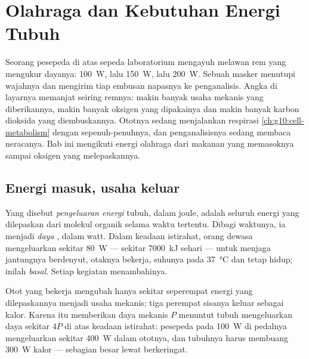 \chapter{Olahraga dan Kebutuhan Energi Tubuh}\label{ch:g10:exercise-and-energy}

Seorang pesepeda di atas sepeda laboratorium mengayuh melawan rem yang
mengukur dayanya: \qty{100}{W}, lalu \qty{150}{W}, lalu \qty{200}{W}.
Sebuah masker menutupi wajahnya dan mengirim tiap embusan napasnya ke
penganalisis. Angka di layarnya memanjat seiring remnya: makin banyak
usaha mekanis yang diberikannya, makin banyak oksigen yang dipakainya
dan makin banyak karbon dioksida yang diembuskannya. Ototnya sedang
menjalankan respirasi \cref{ch:g10:cell-metabolism} dengan
sepenuh-penuhnya, dan penganalisisnya sedang membaca neracanya. Bab ini
mengikuti energi olahraga dari makanan yang memasoknya sampai oksigen
yang melepaskannya.

\section{Energi masuk, usaha keluar}

\begin{definition}\label{def:g10:exercise-and-energy:expenditure}
Yang disebut \emph{pengeluaran energi} tubuh,
dalam joule, adalah seluruh energi yang dilepaskan  dari molekul
organik selama waktu tertentu. Dibagi waktunya, ia menjadi
\emph{daya }, dalam watt. Dalam keadaan istirahat, orang
dewasa mengeluarkan sekitar \qty{80}{W} --- sekitar \qty{7000}{kJ}
sehari --- untuk menjaga jantungnya berdenyut, otaknya bekerja, suhunya
pada \qty{37}{\celsius} dan  tetap hidup; inilah
\emph{ basal}. Setiap kegiatan menambahinya.
\end{definition}

\begin{proposition}\label{prop:g10:exercise-and-energy:efficiency}
Otot yang bekerja mengubah hanya sekitar seperempat energi yang
dilepaskannya menjadi usaha mekanis; tiga perempat sisanya keluar
sebagai kalor. Karena itu memberikan daya mekanis $P$ menuntut tubuh
mengeluarkan daya  sekitar $4P$ di atas keadaan istirahat:
pesepeda pada \qty{100}{W} di pedalnya mengeluarkan sekitar
\qty{400}{W} dalam ototnya, dan tubuhnya harus membuang \qty{300}{W}
kalor --- sebagian besar lewat berkeringat.
\end{proposition}
\admitted

